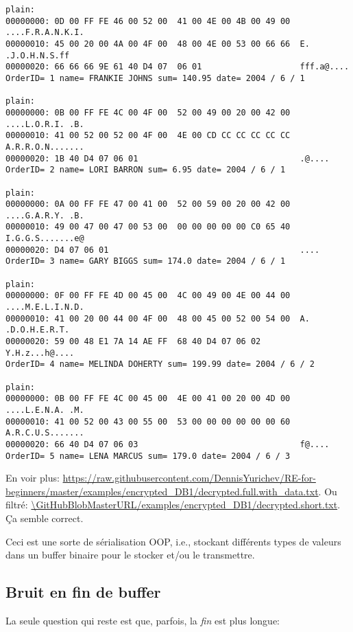 \begin{lstlisting}
plain:
00000000: 0D 00 FF FE 46 00 52 00  41 00 4E 00 4B 00 49 00  ....F.R.A.N.K.I.
00000010: 45 00 20 00 4A 00 4F 00  48 00 4E 00 53 00 66 66  E. .J.O.H.N.S.ff
00000020: 66 66 66 9E 61 40 D4 07  06 01                    fff.a@....
OrderID= 1 name= FRANKIE JOHNS sum= 140.95 date= 2004 / 6 / 1

plain:
00000000: 0B 00 FF FE 4C 00 4F 00  52 00 49 00 20 00 42 00  ....L.O.R.I. .B.
00000010: 41 00 52 00 52 00 4F 00  4E 00 CD CC CC CC CC CC  A.R.R.O.N.......
00000020: 1B 40 D4 07 06 01                                 .@....
OrderID= 2 name= LORI BARRON sum= 6.95 date= 2004 / 6 / 1

plain:
00000000: 0A 00 FF FE 47 00 41 00  52 00 59 00 20 00 42 00  ....G.A.R.Y. .B.
00000010: 49 00 47 00 47 00 53 00  00 00 00 00 00 C0 65 40  I.G.G.S.......e@
00000020: D4 07 06 01                                       ....
OrderID= 3 name= GARY BIGGS sum= 174.0 date= 2004 / 6 / 1

plain:
00000000: 0F 00 FF FE 4D 00 45 00  4C 00 49 00 4E 00 44 00  ....M.E.L.I.N.D.
00000010: 41 00 20 00 44 00 4F 00  48 00 45 00 52 00 54 00  A. .D.O.H.E.R.T.
00000020: 59 00 48 E1 7A 14 AE FF  68 40 D4 07 06 02        Y.H.z...h@....
OrderID= 4 name= MELINDA DOHERTY sum= 199.99 date= 2004 / 6 / 2

plain:
00000000: 0B 00 FF FE 4C 00 45 00  4E 00 41 00 20 00 4D 00  ....L.E.N.A. .M.
00000010: 41 00 52 00 43 00 55 00  53 00 00 00 00 00 00 60  A.R.C.U.S.......
00000020: 66 40 D4 07 06 03                                 f@....
OrderID= 5 name= LENA MARCUS sum= 179.0 date= 2004 / 6 / 3
\end{lstlisting}

En voir plus: \url{https://raw.githubusercontent.com/DennisYurichev/RE-for-beginners/master/examples/encrypted_DB1/decrypted.full.with_data.txt}.
Ou filtré: \url{\GitHubBlobMasterURL/examples/encrypted_DB1/decrypted.short.txt}.
Ça semble correct.

Ceci est une sorte de sérialisation \ac{OOP}, i.e., stockant différents types de
valeurs dans un buffer binaire pour le stocker et/ou le transmettre.

\subsection{Bruit en fin de buffer}

La seule question qui reste est que, parfois, la \emph{fin} est plus longue:

